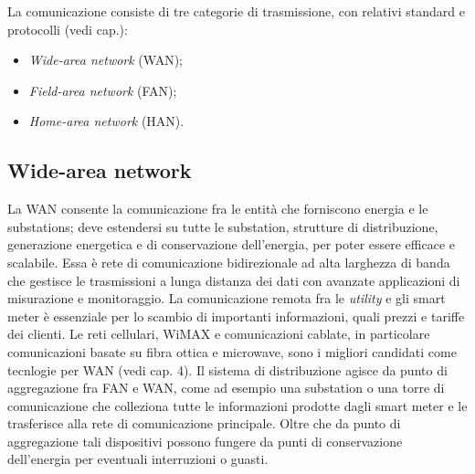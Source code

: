 
La comunicazione consiste di tre categorie di trasmissione, con relativi standard e protocolli (vedi cap.):
\begin{itemize}
	\item \emph{Wide-area network} (WAN);
	\item \emph{Field-area network} (FAN);
	\item \emph{Home-area network} (HAN).
\end{itemize}


\subsection{Wide-area network}
La WAN consente la comunicazione fra le entità che forniscono energia e le substations; deve estendersi su tutte le substation, strutture di distribuzione, generazione energetica e di conservazione dell'energia, per poter essere efficace e scalabile. Essa è rete di comunicazione bidirezionale ad alta larghezza di banda che gestisce le trasmissioni a lunga distanza dei dati con avanzate applicazioni di misurazione e monitoraggio. La comunicazione remota fra le \emph{utility} e gli smart meter è essenziale per lo scambio di importanti informazioni, quali prezzi e tariffe dei clienti. Le reti cellulari, WiMAX e comunicazioni cablate, in particolare comunicazioni basate su fibra ottica e microwave, sono i migliori candidati come tecnlogie per WAN (vedi cap. 4).
\newline
Il sistema di distribuzione agisce da punto di aggregazione fra FAN e WAN, come ad esempio una substation o una torre di comunicazione che colleziona tutte le informazioni prodotte dagli smart meter e le trasferisce alla rete di comunicazione principale. Oltre che da punto di aggregazione tali dispositivi possono fungere da punti di conservazione dell'energia per eventuali interruzioni o guasti.

